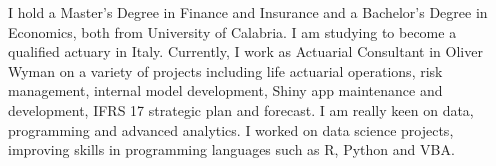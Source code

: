 \documentclass[11pt,a4paper,sans]{moderncv}        %
\begin{document}
\makecvtitle 
\vspace{-20pt}
I hold a Master's Degree in Finance and Insurance and a Bachelor's Degree in Economics, both from University of Calabria. I am studying to become a qualified actuary in Italy. Currently, I work as Actuarial Consultant in Oliver Wyman on a variety of projects including life actuarial operations, risk management, internal model development, Shiny app maintenance and development, IFRS 17 strategic plan and forecast. I am really keen on data, programming and advanced analytics. I worked on data science projects, improving skills in programming languages such as R, Python and VBA.\\
\end{document}
